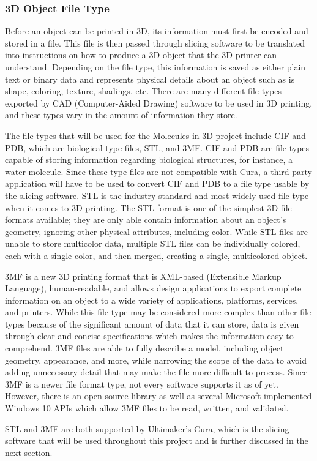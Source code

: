 \documentclass[letterpaper, onecolumn, draftclsnofoot, 10pt, compsoc]{IEEEtran}
\begin{document}
\begin{singlespace}
        \subsubsection{3D Object File Type}
	Before an object can be printed in 3D, its information must first be encoded and stored in a file. 
    This file is then passed through slicing software to be translated into instructions on how to produce a 3D object that the 3D printer can understand. 
	Depending on the file type, this information is saved as either plain text or binary data and represents physical details about an object such as is shape, coloring, texture, shadings, etc. \cite{all3dpweb}
	There are many different file types exported by CAD (Computer-Aided Drawing) software to be used in 3D printing, and these types vary in the amount of information they store. \par
	The file types that will be used for the Molecules in 3D project include CIF and PDB, which are biological type files, STL, and 3MF.
        CIF and PDB are file types capable of storing information regarding biological structures, for instance, a water molecule. 
        Since these type files are not compatible with Cura, a third-party application will have to be used to convert CIF and PDB to a file type usable by the slicing software.
        STL is the industry standard and most widely-used file type when it comes to 3D printing.
        The STL format is one of the simplest 3D file formats available; they are only able contain information about an object's geometry, ignoring other physical attributes, including color.\cite{3dbeginweb}
	While STL files are unable to store multicolor data, multiple STL files can be individually colored, each with a single color, and then merged, creating a single, multicolored object.\par
	3MF is a new 3D printing format that is XML-based (Extensible Markup Language), human-readable, and allows design applications to export complete information on an object to a wide variety of applications, platforms, services, and printers. \cite{3mfweb}
	While this file type may be considered more complex than other file types because of the significant amount of data that it can store, data is given through clear and concise specifications which makes the information easy to comprehend.
	3MF files are able to fully describe a model, including object geometry, appearance, and more, while narrowing the scope of the data to avoid adding unnecessary detail that may make the file more difficult to process. 
	Since 3MF is a newer file format type, not every software supports it as of yet.
	However, there is an open source library as well as several Microsoft implemented Windows 10 APIs which allow 3MF files to be read, written, and validated. \par
    STL and 3MF are both supported by Ultimaker's Cura, which is the slicing software that will be used throughout this project and is further discussed in the next section.
    

\end{singlespace}
\end{document}

